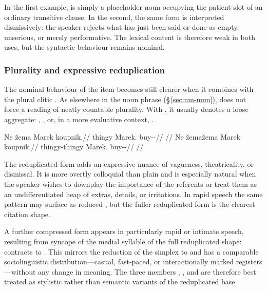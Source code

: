 In the first example,  is simply a placeholder noun occupying the
patient slot of an ordinary transitive clause. In the second, the same form is
interpreted dismissively: the speaker rejects what has just been said or done as
empty, unserious, or merely performative. The lexical content is therefore weak
in both uses, but the syntactic behaviour remains nominal.

\subsubsection{Plurality and expressive reduplication}

The nominal behaviour of the item becomes still clearer when it combines with the
plural clitic . As elsewhere in the noun phrase
(§\,\ref{sec:nm-num}),  does not force a reading of neatly countable
plurality. With , it usually denotes a loose aggregate: , , or, in a more evaluative context, .

\pex
\a
\begingl
\gla Ne žema Marek koupnik.//
\glb \Pl{} thingy Marek.\Trs{} buy-\Trs{}-\Pf{}//
\glft {}//
\endgl
\a
\begingl
\gla Ne žemažema Marek koupnik.//
\glb \Pl{} thingy-thingy Marek.\Trs{} buy-\Trs{}-\Pf{}//
\glft {}//
\endgl
\xe

The reduplicated form  adds an expressive nuance of vagueness,
theatricality, or dismissal. It is more overtly colloquial than plain
 and is especially natural when the speaker wishes to downplay the
importance of the referents or treat them as an undifferentiated heap of extras,
details, or irritations. In rapid speech the same pattern may surface as reduced
, but the fuller reduplicated form is the clearest citation shape.

A further compressed form  appears in particularly rapid or
intimate speech, resulting from syncope of the medial syllable of the full
reduplicated shape:  contracts to . This mirrors
the reduction of the simplex  to  and has a comparable
sociolinguistic distribution---casual, fast-paced, or interactionally marked
registers---without any change in meaning. The three members ,
, and  are therefore best treated as stylistic rather
than semantic variants of the reduplicated base.

